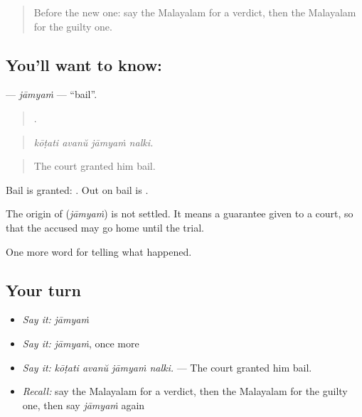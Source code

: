 \label{lesson:ML-C369-jamyam}



\begin{quote}
Before the new one: say the Malayalam for a verdict, then the Malayalam for the guilty one.
\end{quote}

\subsection*{You'll want to know: }
\textbf{} — \emph{jāmyaṁ} — \textquotedblleft{}bail\textquotedblright{}.

\begin{quote}
   .
\end{quote}

\begin{quote}
\emph{kōṭati avanŭ jāmyaṁ nalki.}
\end{quote}

\begin{quote}
The court granted him bail.
\end{quote}

Bail is granted:  . Out on bail is .

\begin{cousinweb}
The origin of \textbf{} (\emph{jāmyaṁ}) is not settled. It means a guarantee given to a court, so that the accused may go home until the trial.
\end{cousinweb}

\begin{grammarlens}[title={What you've built}]
One more word for telling what happened.
\end{grammarlens}

\subsection*{Your turn}
\begin{itemize}
\raggedright
  \item \emph{Say it:} \emph{jāmyaṁ}
  \item \emph{Say it:} \emph{jāmyaṁ}, once more
  \item \emph{Say it:} \emph{kōṭati avanŭ jāmyaṁ nalki.} — The court granted him bail.
  \item \emph{Recall:} say the Malayalam for a verdict, then the Malayalam for the guilty one, then say \emph{jāmyaṁ} again
\end{itemize}

